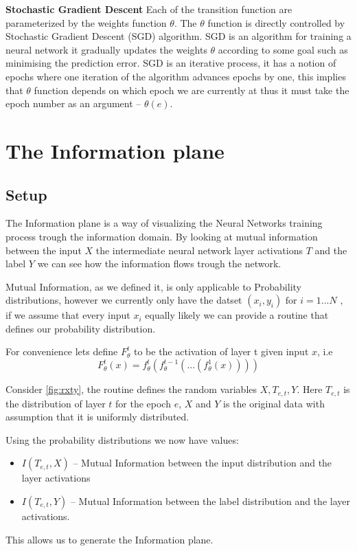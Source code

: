 \textbf{Stochastic Gradient Descent} Each of the transition function are
parameterized by the weights function $\theta$. The $\theta$ function is
directly controlled by Stochastic Gradient Descent (SGD) algorithm.  SGD is an
algorithm for training a neural network it gradually updates the weights
$\theta$ according to some goal such as minimising the prediction error.  SGD is
an iterative process, it has a notion of epochs where one iteration of the
algorithm advances epochs by one, this implies that $\theta$ function depends on
which epoch we are currently at thus it must take the epoch number as an
argument -- $\theta(e)$.

\section{The Information plane}

\subsection{Setup}

The Information plane is a way of visualizing the Neural Networks training
process trough the information domain. By looking at mutual information between
the input $X$ the intermediate neural network layer activations $T$ and the
label $Y$ we can see how the information flows trough the network.

Mutual Information, as we defined it, is only applicable to Probability
distributions, however we currently only have the datset 
$(x_i, y_i) \text{ for } i = 1...N$
, if we assume that every input $x_i$ equally likely we can provide a routine
that defines our probability distribution.

For convenience lets define $F_{\theta}^t$ to be the activation of layer t given
input $x$, i.e
\begin{equation}
  F_{\theta}^t(x) = f_{\theta}^t(f_{\theta}^{t-1}(...(f_{\theta}^1(x))))
  \label{eq:bigF}
\end{equation}


Consider \autoref{fig:rxty}, the routine defines the random variables
$X,T_{e,t},Y$. Here $T_{e,t}$ is the distribution of layer $t$ for the epoch $e$,
$X$ and $Y$ is the original data with assumption that it is uniformly
distributed. 

Using the probability distributions we now have values:
\begin{itemize}
  \item{
      $I(T_{e,t}, X)$ -- Mutual Information between the input distribution and the
      layer activations 
    }
  \item{
      $I(T_{e,t}, Y)$ -- Mutual Information between the label distribution and the
      layer activations.
    }
\end{itemize}
This allows us to generate the Information plane.


